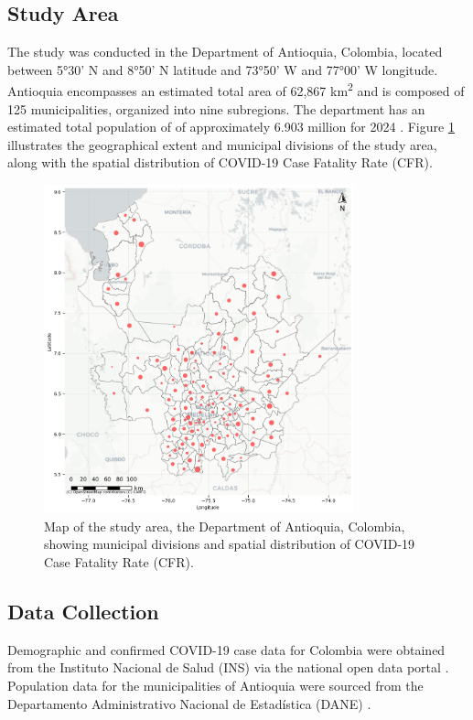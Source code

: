 \documentclass[a4paper,fleqn]{cas-sc}
\begin{document}
\subsection{Study Area}
The study was conducted in the Department of Antioquia, Colombia, located between 5°30' N and 8°50' N latitude and 73°50' W and 77°00' W longitude. Antioquia encompasses an estimated total area of 62,867 km\textsuperscript{2} and is composed of 125 municipalities, organized into nine subregions. The department has an estimated total population of of approximately 6.903 million for 2024 \cite{DANE_co, DSSA_co}. Figure \ref{DIV-Ant} illustrates the geographical extent and municipal divisions of the study area, along with the spatial distribution of COVID-19 Case Fatality Rate (CFR).

\begin{figure}[htbp]
  \centering
  \includegraphics[width=0.8\textwidth]{figures/figure01.png}
  \caption{Map of the study area, the Department of Antioquia, Colombia, showing municipal divisions and spatial distribution of COVID-19 Case Fatality Rate (CFR).}\label{DIV-Ant}
\end{figure}

\subsection{Data Collection}

Demographic and confirmed COVID-19 case data for Colombia were obtained from the Instituto Nacional de Salud (INS) \citep{INS_co} via the national open data portal \citep{DATOS_co}. Population data for the municipalities of Antioquia were sourced from the Departamento Administrativo Nacional de Estadística (DANE) \citep{DANE_co}.
\end{document}
